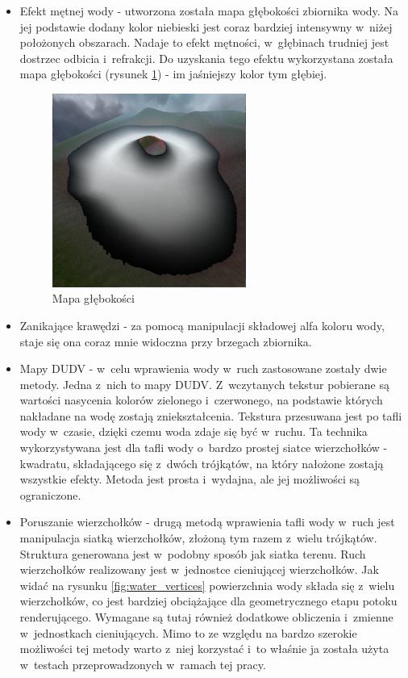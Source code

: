 \documentclass[a4paper,twoside,12pt]{book}
\begin{document}
\begin{itemize}
    \item Efekt mętnej wody - utworzona została mapa głębokości zbiornika wody. Na jej podstawie dodany kolor niebieski jest coraz bardziej intensywny w~niżej położonych obszarach. Nadaje to efekt mętności, w~głębinach trudniej jest dostrzec odbicia i~refrakcji. Do uzyskania tego efektu wykorzystana została mapa głębokości (rysunek \ref{fig:water_depth}) - im jaśniejszy kolor tym głębiej.
    
    \begin{figure}[H]
        \centering
        \includegraphics[width=0.6\textwidth]{res/water_depth.png}
        \caption{Mapa głębokości}
        \label{fig:water_depth}
    \end{figure}
    
    \item Zanikające krawędzi - za pomocą manipulacji składowej alfa koloru wody, staje się ona coraz mnie widoczna przy brzegach zbiornika.
    \item Mapy DUDV - w~celu wprawienia wody w~ruch zastosowane zostały dwie metody. Jedna z~nich to mapy DUDV. Z~wczytanych tekstur pobierane są wartości nasycenia kolorów zielonego i~czerwonego, na podstawie których nakładane na wodę zostają zniekształcenia. Tekstura przesuwana jest po tafli wody w~czasie, dzięki czemu woda zdaje się być w~ruchu. Ta technika wykorzystywana jest dla tafli wody o~bardzo prostej siatce wierzchołków - kwadratu, składającego się z~dwóch trójkątów, na który nałożone zostają wszystkie efekty. Metoda jest prosta i~wydajna, ale jej możliwości są ograniczone.
    \item Poruszanie wierzchołków - drugą metodą wprawienia tafli wody w~ruch jest manipulacja siatką wierzchołków, złożoną tym razem z~wielu trójkątów. Struktura generowana jest w~podobny sposób jak siatka terenu. Ruch wierzchołków realizowany jest w~jednostce cieniującej wierzchołków. Jak widać na rysunku \ref{fig:water_vertices} powierzchnia wody składa się z~wielu wierzchołków, co jest bardziej obciążające dla geometrycznego etapu potoku renderującego. Wymagane są tutaj również dodatkowe obliczenia i~zmienne w~jednostkach cieniujących. Mimo to ze względu na bardzo szerokie możliwości tej metody warto z~niej korzystać i~to właśnie ja została użyta w~testach przeprowadzonych w~ramach tej pracy.
    

\end{itemize}
\end{document}
